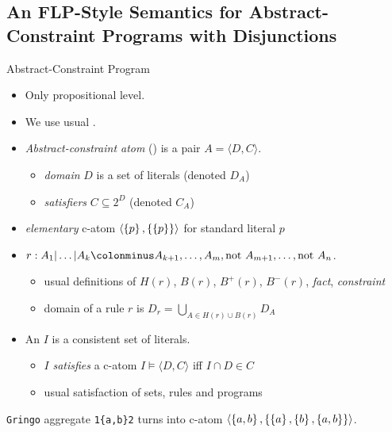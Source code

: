 \documentclass[trans,draft]{beamer} %
\newcommand{\catom}[2]{\ensuremath{\langle #1, #2 \rangle}}
\begin{document}
\subsection[Abstract-Constraint Semantics]{An FLP-Style Semantics for Abstract-Constraint Programs with Disjunctions}

\begin{frame}{Abstract-Constraint Program \cite{flp-for-acp}}

	\begin{itemize}
		\item Only propositional level.
		\pause
		\item We use usual .
		\pause
		\item \emph{Abstract-constraint atom} (\emph{}) is a pair $A = \catom{D}{C}$.
		\begin{itemize}
			\item \emph{domain} $D$ is a set of literals (denoted $D_A$)
			\item \emph{satisfiers} $C \subseteq 2^D$ (denoted $C_A$)
		\end{itemize}
		\pause
		\item \emph{elementary} c-atom $\catom{\set{p}}{\set{\set{p}}}$ for standard literal $p$
		\pause
		\item \emph{} $r : A_1 | \ldots | A_k \colonminus A_{k+1}, \ldots, A_m, \text{not } A_{m+1}, \ldots, \text{not } A_n$.
		\begin{itemize}
			\item usual definitions of $H(r)$, $B(r)$, $B^+(r)$, $B^-(r)$, \emph{fact}, \emph{constraint}
			\item domain of a rule $r$ is $D_r = \bigcup_{A \in H(r) \cup B(r)} D_A$
		\end{itemize}
		\pause
		\item An \emph{} $I$ is a consistent set of literals.
		\begin{itemize}
			\item $I$ \emph{satisfies} a c-atom $I \models \catom{D}{C}$ iff $I \cap D \in C$
			\item usual satisfaction of sets, rules and programs
		\end{itemize}
	\end{itemize}

	\pause

	\begin{example}
	\texttt{Gringo} aggregate \texttt{1\{a,b\}2}\newline
	turns into c-atom $\catom{\set{a,b}}{\set{\set{a}, \set{b}, \set{a,b}}}$.
	\end{example}

\end{frame}
\end{document}
